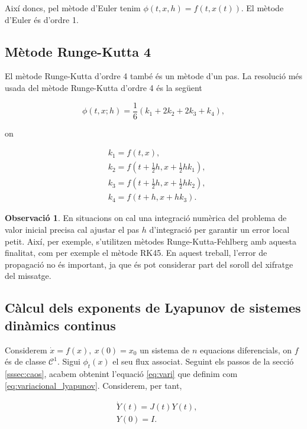 \documentclass[11pt,a4paper,openright,oneside]{article}
\numberwithin{equation}{section}
\theoremstyle{definition}
\newtheorem{obs}[teo]{Observaci\'o}
\begin{document}
Així doncs, pel mètode d'Euler tenim $\phi(t, x, h)=f(t, x(t))$. El mètode d'Euler és d'ordre 1.

\subsection*{Mètode Runge-Kutta 4}

El mètode Runge-Kutta d'ordre 4 també és un mètode d'un pas. La resolució més usada del mètode Runge-Kutta d'ordre 4 és la següent

\begin{equation*}
    \phi(t, x; h) = \frac{1}{6}(k_1 + 2k_2 + 2k_3 + k_4),
\end{equation*}

on

\begin{equation*} \begin{aligned}
    &k_1 = f(t,x),\\
    &k_2 = f(t + \frac{1}{2}h, x + \frac{1}{2}hk_1),\\
    &k_3 = f(t + \frac{1}{2}h, x + \frac{1}{2}hk_2),\\
    &k_4 = f(t + h, x + hk_3).
\end{aligned}\end{equation*}

\begin{obs}
    En situacions on cal una integració numèrica del problema de valor inicial precisa cal ajustar el pas $h$ d'integració per garantir un error local petit. Així, per exemple, s'utilitzen mètodes Runge-Kutta-Fehlberg amb aquesta finalitat, com per exemple el mètode RK45. En aquest treball, l'error de propagació no és important, ja que és pot considerar part del soroll del xifratge del missatge.
\end{obs}

\subsection{Càlcul dels exponents de Lyapunov de sistemes dinàmics continus} \label{ap:annex_2}

Considerem $\dot{x}=f(x), \ x(0)=x_0$ un sistema de $n$ equacions diferencials, on $f$ és de classe $\mathcal{C}^1$. Sigui $\phi_t(x)$ el seu flux associat. Seguint els passos de la secció \ref{sssec:caos}, acabem obtenint l'equació \eqref{eq:vari} que definim com \eqref{eq:variacional_lyapunov}. Considerem, per tant, 

\begin{equation} \begin{aligned} \label{eq:var}
    &\dot{Y}(t)=J(t)Y(t), \\
    &Y(0)=I.
\end{aligned} \end{equation}
\end{document}
